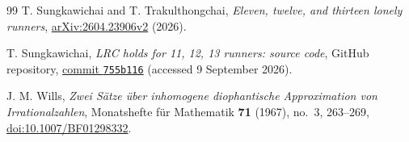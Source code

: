\documentclass[11pt]{article}
\theoremstyle{definition}
\theoremstyle{remark}
\begin{document}
\begin{thebibliography}{99}
T. Sungkawichai and T. Trakulthongchai,
\emph{Eleven, twelve, and thirteen lonely runners},
\href{https://arxiv.org/abs/2604.23906}{arXiv:2604.23906v2} (2026).

T. Sungkawichai,
\emph{LRC holds for 11, 12, 13 runners: source code},
GitHub repository,
\href{https://github.com/vzsky/13-lonely-runners/tree/755b116}%
{commit \texttt{755b116}} (accessed 9 September 2026).

J. M. Wills,
\emph{Zwei S\"atze \"uber inhomogene diophantische Approximation von
Irrationalzahlen},
Monatshefte f\"ur Mathematik \textbf{71} (1967), no.~3, 263--269,
\href{https://doi.org/10.1007/BF01298332}{doi:10.1007/BF01298332}.

\end{thebibliography}
\end{document}
